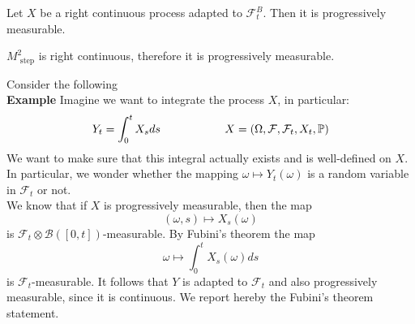 \begin{PropBox}
    \begin{Proposition}
\label{prop_progressive}
    Let $X$ be a right continuous process adapted to $\mathcal{F}_t^B$. Then it is progressively measurable.
\end{Proposition}
\end{PropBox}
\begin{remark}
    $M^2_{\text{ step}}$ is right continuous, therefore it is progressively measurable. 
\end{remark}
Consider the following \\
\textbf{Example} Imagine we want to integrate the process $X$, in particular:
\begin{equation*}
    Y_t = \int_0^t X_s ds \hspace{2 cm} X=(\Omega, \mathcal{F}, \mathcal{F}_t, X_t, \mathbb{P})
\end{equation*}
We want to make sure that this integral actually exists and is well-defined on $X$. 
In particular, we wonder whether the mapping $\omega \mapsto Y_t(\omega)$ is a random variable in $\mathcal{F}_t$ or not. \\
We know that if $X$ is progressively measurable, then the map 
\begin{equation}
\label{ex_map}
    (\omega, s) \mapsto X_s(\omega) 
\end{equation}
is $\mathcal{F}_t \otimes \mathcal{B}([0,t])$-measurable. By Fubini's theorem the map
\begin{equation*}
    \omega \mapsto \int_0^t X_s(\omega) ds 
\end{equation*}
is $\mathcal{F}_t$-measurable. It follows that $Y$ is adapted to $\mathcal{F}_t$ and also progressively measurable, since it is continuous. We report hereby the Fubini's theorem statement. 
